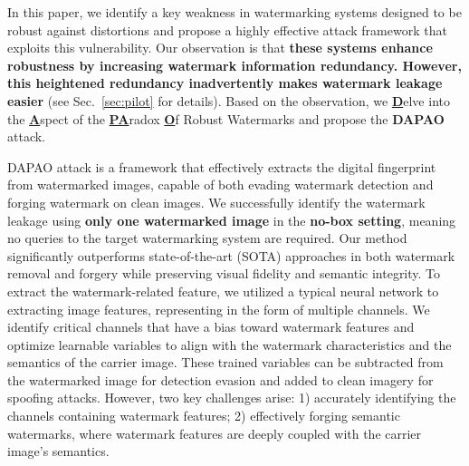 



In this paper, we identify a key weakness in watermarking systems designed to be robust against distortions and propose a highly effective attack framework that exploits this vulnerability. Our observation is that \textbf{these systems enhance robustness by increasing watermark information redundancy. However, this heightened redundancy inadvertently makes watermark leakage easier} (see Sec.~\ref{sec:pilot} for details). Based on the observation, we \underline{\textbf{D}}elve into the \underline{\textbf{A}}spect of the \underline{\textbf{PA}}radox \underline{\textbf{O}}f Robust Watermarks and propose the \textbf{DAPAO} attack.


DAPAO attack is a framework that effectively extracts the digital fingerprint from watermarked images, capable of both evading watermark detection and forging watermark on clean images. We successfully identify the watermark leakage using \textbf{only one watermarked image} in the \textbf{no-box setting}, meaning no queries to the target watermarking system are required. Our method significantly outperforms state-of-the-art (SOTA) approaches in both watermark removal and forgery while preserving visual fidelity and semantic integrity. To extract the watermark-related feature, we utilized a typical neural network to extracting image features, representing in the form of multiple channels. We identify critical channels that have a bias toward watermark features and optimize learnable variables to align with the watermark characteristics and the semantics of the carrier image. These trained variables can be subtracted from the watermarked image for detection evasion and added to clean imagery for spoofing attacks. However, two key challenges arise: 1) accurately identifying the channels containing watermark features; 2) effectively forging semantic watermarks, where watermark features are deeply coupled with the carrier image’s semantics. 

